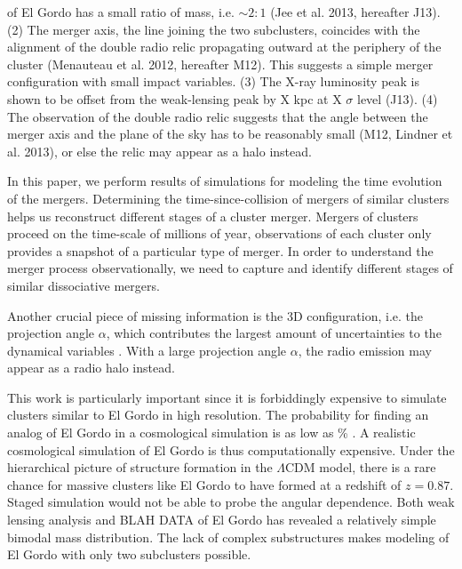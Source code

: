 of El Gordo has a small ratio of mass, i.e. $\sim 2:1$ (Jee et al. 2013,
hereafter J13). (2) The merger axis, the line joining the two subclusters,
coincides with the alignment of the double radio relic propagating outward at the periphery of the cluster (Menauteau et al. 2012,
hereafter M12). This suggests a simple merger configuration with small
impact variables.  (3) The X-ray luminosity peak is shown to be offset
from the weak-lensing peak by X kpc at X $\sigma$ level (J13). (4) The
observation of the double radio relic suggests that the angle between the
merger axis and the plane of the sky has to be reasonably small (M12,
Lindner et al. 2013), or else
the relic may appear as a halo instead. \citep{S13} \par 


In this paper, we perform results of simulations for modeling the time
evolution of the mergers. 
Determining the time-since-collision of mergers of similar clusters helps
us reconstruct different stages of a cluster merger.
Mergers of clusters proceed on the time-scale of millions of year,
observations of each cluster only provides a snapshot of a particular type
of merger. In order to understand the merger process observationally, 
we need to capture
and identify different stages of similar dissociative mergers. \par 

Another crucial piece of missing information is the 3D
configuration, i.e. the projection angle $\alpha$, which contributes the
largest amount of uncertainties to the dynamical variables \citep{D13}.
With a large projection angle $\alpha$, the radio emission may appear as a
radio halo instead.  \citep{S13}\par 
This work is particularly important since it is forbiddingly
expensive to simulate clusters similar to El Gordo in high resolution. 
The probability for finding an analog of El Gordo in a cosmological
simulation is as low as \% . A realistic cosmological simulation of
El Gordo is thus computationally expensive. Under the hierarchical picture
of structure formation in the $\Lambda$CDM model, there is a rare
chance for massive clusters like El Gordo to have formed at a redshift of
$z = 0.87$.  Staged simulation would not be able to probe the angular
dependence. 
Both weak lensing analysis and BLAH DATA of El Gordo \citep{Jee13} has revealed a
relatively simple bimodal mass distribution.  The lack of complex
substructures makes modeling of El Gordo with only two subclusters possible.

